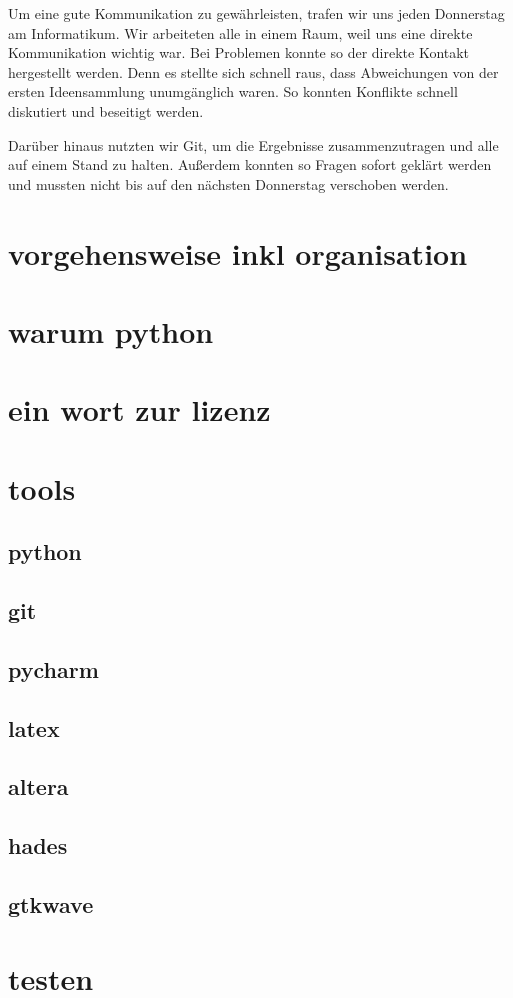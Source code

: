  Um eine gute Kommunikation zu gewährleisten, trafen wir uns jeden Donnerstag am Informatikum. Wir arbeiteten alle in einem Raum, weil uns eine direkte Kommunikation wichtig war. Bei Problemen konnte so der direkte Kontakt hergestellt werden. Denn es stellte sich schnell raus, dass Abweichungen von der ersten Ideensammlung unumgänglich waren. So konnten Konflikte schnell diskutiert und beseitigt werden.

Darüber hinaus nutzten wir Git, um die Ergebnisse zusammenzutragen und alle auf einem Stand zu halten. Außerdem konnten so Fragen sofort geklärt werden und mussten nicht bis auf den nächsten Donnerstag verschoben werden.


\section{vorgehensweise inkl organisation}
\section{warum python} %
\section{ein wort zur lizenz} %
\section{tools}
\subsection{python}
\subsection{git}
\subsection{pycharm}
\subsection{latex}
\subsection{altera}
\subsection{hades}
\subsection{gtkwave}
\section{testen}



